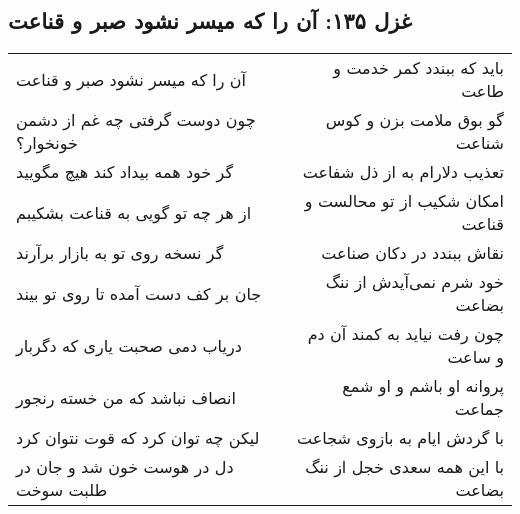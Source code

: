 \begin{center}
\section*{غزل ۱۳۵: آن را که میسر نشود صبر و قناعت}
\label{sec:135}
\begin{longtable}{l p{0.5cm} r}
آن را که میسر نشود صبر و قناعت
&&
باید که ببندد کمر خدمت و طاعت
\\
چون دوست گرفتی چه غم از دشمن خونخوار؟
&&
گو بوق ملامت بزن و کوس شناعت
\\
گر خود همه بیداد کند هیچ مگویید
&&
تعذیب دلارام به از ذل شفاعت
\\
از هر چه تو گویی به قناعت بشکیبم
&&
امکان شکیب از تو محالست و قناعت
\\
گر نسخه روی تو به بازار برآرند
&&
نقاش ببندد در دکان صناعت
\\
جان بر کف دست آمده تا روی تو بیند
&&
خود شرم نمی‌آیدش از ننگ بضاعت
\\
دریاب دمی صحبت یاری که دگربار
&&
چون رفت نیاید به کمند آن دم و ساعت
\\
انصاف نباشد که من خسته رنجور
&&
پروانه او باشم و او شمع جماعت
\\
لیکن چه توان کرد که قوت نتوان کرد
&&
با گردش ایام به بازوی شجاعت
\\
دل در هوست خون شد و جان در طلبت سوخت
&&
با این همه سعدی خجل از ننگ بضاعت
\\
\end{longtable}
\end{center}
